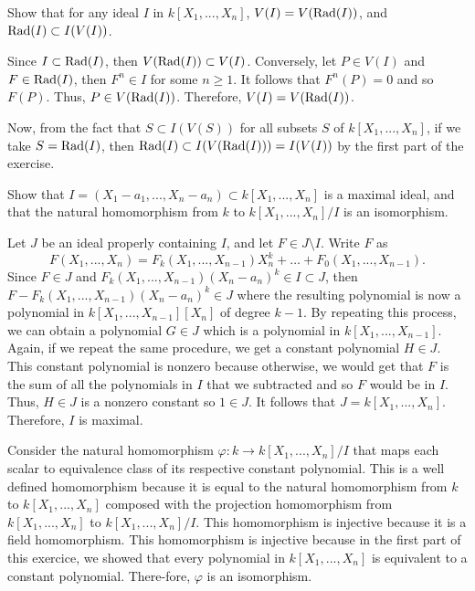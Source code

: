 \begin{exercise}
    Show that for any ideal $I$ in $k[X_1, ..., X_n]$, $V(I) = V(\operatorname{Rad}(I))$, and $\operatorname{Rad}(I) \subset I(V(I))$. \\
\end{exercise}

\begin{solution}
    Since $I \subset \operatorname{Rad}(I)$, then $V(\operatorname{Rad}(I)) \subset V(I)$. Conversely, let $P \in V(I)$ and $F \in \operatorname{Rad}(I)$, then $F^n \in I$ for some $n \geq 1$. It follows that $F^n(P) = 0$ and so $F(P)$. Thus, $P \in V(\operatorname{Rad}(I))$. Therefore, $V(I) = V(\operatorname{Rad}(I))$.
    
    Now, from the fact that $S \subset I(V(S))$ for all subsets $S$ of $k[X_1, ..., X_n]$, if we take $S = \operatorname{Rad}(I)$, then $\operatorname{Rad}(I) \subset I(V(\operatorname{Rad}(I))) = I(V(I))$ by the first part of the exercise. \\
\end{solution}

\begin{exercise}
    Show that $I = (X_1 - a_1, ..., X_n - a_n) \subset k[X_1, ..., X_n]$ is a maximal ideal, and that the natural homomorphism from $k$ to $k[X_1, ..., X_n]/I$ is an isomorphism. \\
\end{exercise}

\begin{solution}
    Let $J$ be an ideal properly containing $I$, and let $F \in J \setminus I$. Write $F$ as
    $$F(X_1, ..., X_n) = F_k(X_1, ..., X_{n-1})X_n^k + \dots + F_0(X_1, ..., X_{n-1}).$$
    Since $F \in J$ and $F_k(X_1, ..., X_{n-1})(X_n - a_n)^k \in I \subset J$, then $F - F_k(X_1, ..., X_{n-1})(X_n - a_n)^k \in J$ where the resulting polynomial is now a polynomial in $k[X_1, ..., X_{n-1}][X_n]$ of degree $k-1$. By repeating this process, we can obtain a polynomial $G \in J$ which is a polynomial in $k[X_1, ..., X_{n-1}]$. Again, if we repeat the same procedure, we get a constant polynomial $H \in J$. This constant polynomial is nonzero because otherwise, we would get that $F$ is the sum of all the polynomials in $I$ that we subtracted and so $F$ would be in $I$. Thus, $H \in J$ is a nonzero constant so $1 \in J$. It follows that $J = k[X_1, ..., X_n]$. Therefore, $I$ is maximal.
    
    Consider the natural homomorphism $\varphi : k \to k[X_1, ..., X_n]/I$ that maps each scalar to equivalence class of its respective constant polynomial. This is a well defined homomorphism because it is equal to the natural homomorphism from $k$ to $k[X_1, ..., X_n]$ composed with the projection homomorphism from $k[X_1, ..., X_n]$ to $k[X_1, ..., X_n]/I$. This homomorphism is injective because it is a field homomorphism. This homomorphism is injective because in the first part of this exercice, we showed that every polynomial in $k[X_1, ..., X_n]$ is equivalent to a constant polynomial. There-fore, $\varphi$ is an isomorphism. 
\end{solution}

